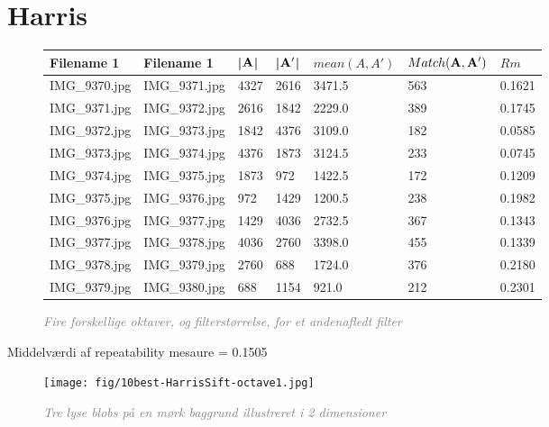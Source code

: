 \section{Harris}


\begin{figure}[H]
    \centering
    \begin{center}    
    \begin{tabular}{ | l | l | l | l | l | l | l |}
    \hline
    Filename 1 & Filename 1 & |$\bold{A}$| & |$\bold{A'}$| & $mean(A,A')$ & $Match(\bold{A}, \bold{A}')$ & $Rm$ \\ \hline
IMG\_9370.jpg &	IMG\_9371.jpg &	4327 &	2616 &	3471.5 &	563 &	0.1621\\ \hline
IMG\_9371.jpg &	IMG\_9372.jpg &	2616 &	1842 &	2229.0 &	389 &	0.1745\\ \hline
IMG\_9372.jpg &	IMG\_9373.jpg &	1842 &	4376 &	3109.0 &	182 &	0.0585\\ \hline
IMG\_9373.jpg &	IMG\_9374.jpg &	4376 &	1873 &	3124.5 &	233 &	0.0745\\ \hline
IMG\_9374.jpg &	IMG\_9375.jpg &	1873 &	972 &	1422.5 &	172 &	0.1209\\ \hline
IMG\_9375.jpg &	IMG\_9376.jpg &	972 &	1429 &	1200.5 &	238 &	0.1982\\ \hline
IMG\_9376.jpg &	IMG\_9377.jpg &	1429 &	4036 &	2732.5 &	367 &	0.1343\\ \hline
IMG\_9377.jpg &	IMG\_9378.jpg &	4036 &	2760 &	3398.0 &	455 &	0.1339\\ \hline
IMG\_9378.jpg &	IMG\_9379.jpg &	2760 &	688 &	1724.0 &	376 &	0.2180\\ \hline
IMG\_9379.jpg &	IMG\_9380.jpg &	688 &	1154 &	921.0  &	212 &	0.2301\\ \hline
    \end{tabular}       
    \caption{\textcolor{gray}{\footnotesize \textit{Fire forskellige oktaver, og filterstørrelse, for et andenafledt filter}}}
    \label{tab:HARRISOCTAVE2}
     \end{center}
     \vspace{-2.5em}
\end{figure} \noindent
Middelværdi af repeatability mesaure  = 0.1505


\begin{figure}[H]
    \centering
    \texttt{[image: fig/10best-HarrisSift-octave1.jpg]}
    \vspace{-0.5em}   
    \begin{center}
    \caption{\textcolor{gray}{\footnotesize \textit{
    Tre lyse blobs på en mørk baggrund illustreret i 2 dimensioner \cite{blob}}}}
    \label{fig:lindblob}
     \end{center}
  \end{figure}
       \vspace{-2.7em}
\noindent






